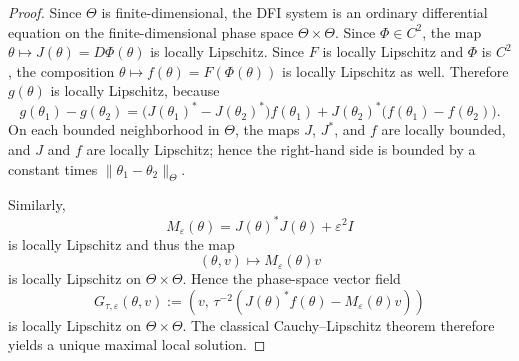 \documentclass[oneside,11pt]{article}
\theoremstyle{remark}
\theoremstyle{thmstyleone}
\theoremstyle{thmstylethree}
\theoremstyle{thmstyletwo}
\begin{document}
  \begin{proof} Since $\Theta$ is finite-dimensional, the DFI system is an ordinary differential equation on the finite-dimensional phase space $\Theta\times\Theta$. 
          Since $\Phi\in C^2$, the map $\theta\mapsto J(\theta)=D\Phi(\theta)$ is locally Lipschitz.
          Since $F$ is locally Lipschitz and $\Phi$ is $C^2$, the composition $\theta\mapsto f(\theta)=F(\Phi(\theta))$ is locally Lipschitz as well. Therefore $g(\theta)$ is locally Lipschitz, because
\[
g(\theta_1)-g(\theta_2)
=
\bigl(J(\theta_1)^*-J(\theta_2)^*\bigr)f(\theta_1)
+
J(\theta_2)^*\bigl(f(\theta_1)-f(\theta_2)\bigr).
\]
On each bounded neighborhood in $\Theta$, the maps $J$, $J^*$, and $f$ are locally bounded, and $J$ and $f$ are locally Lipschitz; hence the right-hand side is bounded by a constant times $\|\theta_1-\theta_2\|_\Theta$.

Similarly, 
\[
M_\varepsilon(\theta)=J(\theta)^*J(\theta)+\varepsilon^2I
\]
is locally Lipschitz and thus the map
\[
(\theta,v)\mapsto M_\varepsilon(\theta)v
\]
is locally Lipschitz on $\Theta\times\Theta$. 
          Hence the phase-space vector field
          \begin{equation*}
            G_{\tau,\varepsilon}(\theta,v)
            :=
            \left(
            v,\,
            \tau^{-2}\left(J(\theta)^*f(\theta)-M_\varepsilon(\theta)v\right)
            \right)
          \end{equation*}
          is locally Lipschitz on $\Theta\times \Theta$.
          The classical Cauchy--Lipschitz theorem therefore yields a unique maximal local solution.
        \end{proof}
        
\end{document}
